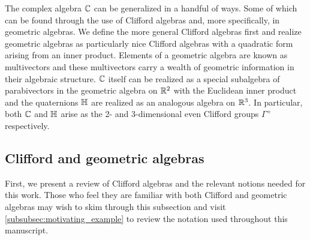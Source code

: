 The complex algebra $\mathbb{C}$ can be generalized in a handful of ways.  Some of which can be found through the use of Clifford algebras and, more specifically, in geometric algebras.  We define the more general Clifford algebras first and realize geometric algebras as particularly nice Clifford algebras with a quadratic form arising from an inner product. Elements of a geometric algebra are known as multivectors and these multivectors carry a wealth of geometric information in their algebraic structure. $\mathbb{C}$ itself can be realized as a special subalgebra of parabivectors in the geometric algebra on $\mathbb{R}^2$ with the Euclidean inner product and the quaternions $\mathbb{H}$ are realized as an analogous algebra on $\mathbb{R}^3$. In particular, both $\mathbb{C}$ and $\mathbb{H}$ arise as the 2- and 3-dimensional even Clifford groups $\Gamma^+$ respectively. 

\subsection{Clifford and geometric algebras}
\label{subsec:clifford_and_geometric_algebras}

First, we present a review of Clifford algebras and the relevant notions needed for this work. Those who feel they are familiar with both Clifford and geometric algebras may wish to skim through this subsection and visit \cref{subsubsec:motivating_example} to review the notation used throughout this manuscript. 


